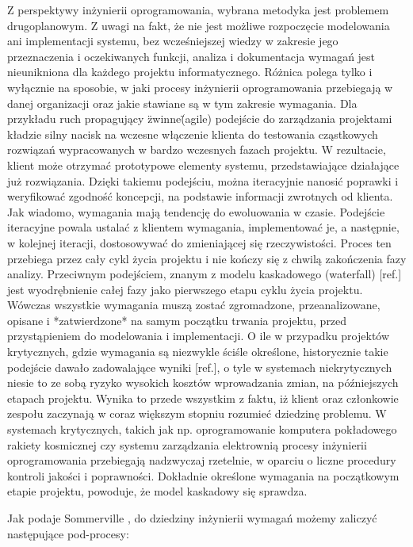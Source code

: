       Z perspektywy inżynierii oprogramowania, wybrana metodyka jest problemem drugoplanowym. Z uwagi na fakt, że nie jest możliwe rozpoczęcie modelowania ani implementacji systemu, bez wcześniejszej wiedzy w zakresie jego przeznaczenia i oczekiwanych funkcji, analiza i dokumentacja wymagań jest nieunikniona dla każdego projektu informatycznego. Różnica polega tylko i wyłącznie na sposobie, w jaki procesy inżynierii oprogramowania przebiegają w danej organizacji oraz jakie stawiane są w tym zakresie wymagania. Dla przykładu ruch propagujący \"zwinne\" (agile) podejście do zarządzania projektami kładzie silny nacisk na wczesne włączenie klienta do testowania cząstkowych rozwiązań wypracowanych w bardzo wczesnych fazach projektu. W rezultacie, klient może otrzymać prototypowe elementy systemu, przedstawiające działające już rozwiązania. Dzięki takiemu podejściu, można iteracyjnie nanosić poprawki i weryfikować zgodność koncepcji, na podstawie informacji zwrotnych od klienta. Jak wiadomo, wymagania mają tendencję do ewoluowania w czasie. Podejście iteracyjne powala ustalać z klientem wymagania, implementować je, a następnie, w kolejnej iteracji, dostosowywać do zmieniającej się rzeczywistości. Proces ten przebiega przez cały cykl życia projektu i nie kończy się z chwilą zakończenia fazy analizy. Przeciwnym podejściem, znanym z modelu kaskadowego (waterfall) [ref.] jest wyodrębnienie całej fazy jako pierwszego etapu cyklu życia projektu. Wówczas wszystkie wymagania muszą zostać zgromadzone, przeanalizowane, opisane i *zatwierdzone* na samym początku trwania projektu, przed przystąpieniem do modelowania i implementacji. O ile w przypadku projektów krytycznych, gdzie wymagania są niezwykle ściśle określone, historycznie takie podejście dawało zadowalające wyniki [ref.], o tyle w systemach niekrytycznych niesie to ze sobą ryzyko wysokich kosztów wprowadzania zmian, na późniejszych etapach projektu. Wynika to przede wszystkim z faktu, iż klient oraz członkowie zespołu zaczynają w coraz większym stopniu rozumieć dziedzinę problemu. W systemach krytycznych, takich jak np. oprogramowanie komputera pokładowego rakiety kosmicznej czy systemu zarządzania elektrownią procesy inżynierii oprogramowania przebiegają nadzwyczaj rzetelnie, w oparciu o liczne procedury kontroli jakości i poprawności. Dokładnie określone wymagania na początkowym etapie projektu, powoduje, że model kaskadowy się sprawdza. \cite{NasaSE} 

      Jak podaje Sommerville \cite{Somm06}, do dziedziny inżynierii wymagań możemy zaliczyć następujące pod-procesy:

